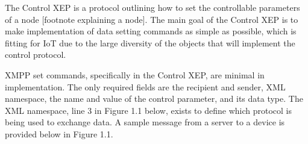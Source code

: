The Control XEP is a protocol outlining how to set the controllable parameters 
of a node [footnote explaining a node]. The main goal of the Control XEP is 
to make implementation of data setting commands as simple as possible, which is 
fitting for IoT due to the large diversity of the objects that will implement 
the control protocol.

XMPP set commands, specifically in the Control XEP, are minimal in implementation. 
The only required fields are the recipient and sender, XML namespace, the name 
and value of the control parameter, and its data type. The XML namespace, line 
3 in Figure 1.1 below, exists to define which protocol is being used to 
exchange data. A sample message from a server to a device is provided below in 
Figure 1.1.



